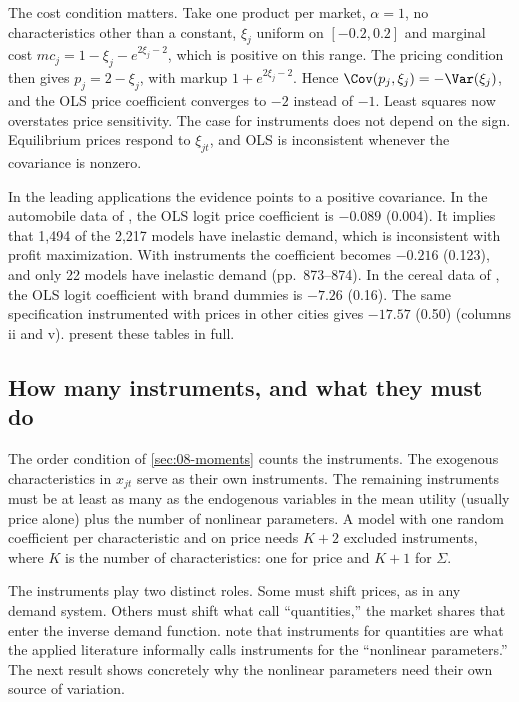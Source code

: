 The cost condition matters. Take one product per market, $\alpha = 1$, no characteristics other than a constant, $\xi_j$ uniform on
$[-0.2, 0.2]$ and marginal cost $mc_j = 1 - \xi_j - e^{2\xi_j - 2}$, which is positive on this range. The
pricing condition then gives $p_j = 2 - \xi_j$, with markup $1 + e^{2\xi_j - 2}$. Hence $\Cov(p_j, \xi_j) =
-\Var(\xi_j)$, and the OLS price coefficient converges to $-2$ instead of $-1$. Least squares now overstates
price sensitivity. The case for instruments does not depend on the sign. Equilibrium prices respond to
$\xi_{jt}$, and OLS is inconsistent whenever the covariance is nonzero.

In the leading applications the evidence points to a positive covariance. In the automobile data of \citet[Table III]{BerryLevinsohnPakes1995}, the
OLS logit price coefficient is $-0.089$ (0.004). It implies that 1,494 of the 2,217 models have inelastic
demand, which is inconsistent with profit maximization. With instruments the coefficient becomes $-0.216$
(0.123), and only 22 models have inelastic demand (pp.~873--874). In the cereal data of \citet[Table V]%
{Nevo2001}, the OLS logit coefficient with brand dummies is $-7.26$ (0.16). The same specification
instrumented with prices in other cities gives $-17.57$ (0.50) (columns ii and v).  present these tables in
full.

\subsection{How many instruments, and what they must do}\label{sec:08-iv-roles}

The order condition of \cref{sec:08-moments} counts the instruments. The exogenous characteristics in
$x_{jt}$ serve as their own instruments. The remaining instruments must be at least as many as the
endogenous variables in the mean utility (usually price alone) plus the number of nonlinear parameters. A
model with one random coefficient per characteristic and on price needs $K + 2$ excluded instruments,
where $K$ is the number of characteristics: one for price and $K + 1$ for $\Sigma$.

The instruments play two distinct roles. Some must shift prices, as in any demand system. Others must shift
what \citet[Section 7]{BerryHaile2014} call ``quantities,'' the market shares that enter the inverse demand
function. \citet[p.~1136, n.~2]{BerryHaile2024} note that instruments for quantities are what the applied
literature informally calls instruments for the ``nonlinear parameters.'' The next result shows concretely why
the nonlinear parameters need their own source of variation.

